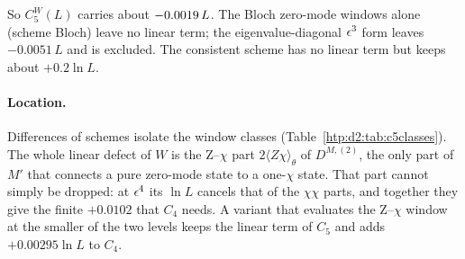 So $C_5^W(L)$ carries about $-0.0019\,L$. The Bloch zero-mode windows alone (scheme Bloch) leave no linear term; the
eigenvalue-diagonal $\epsilon^3$ form leaves $-0.0051\,L$ and is excluded. The consistent scheme has no linear term but keeps
about $+0.2\ln L$.

\paragraph{Location.} Differences of schemes isolate the window classes (Table~\ref{htp:d2:tab:c5classes}). The whole linear
defect of $W$ is the Z--$\chi$ part $2\langle Z\chi\rangle_\theta$ of $D^{M,(2)}$, the only part of $M'$ that connects a pure
zero-mode state to a one-$\chi$ state. That part cannot simply be dropped: at $\epsilon^4$ its $\ln L$ cancels that of the
$\chi\chi$ parts, and together they give the finite $+0.0102$ that $C_4$ needs. A variant that evaluates the Z--$\chi$ window
at the smaller of the two levels keeps the linear term of $C_5$ and adds $+0.00295\ln L$ to $C_4$.

